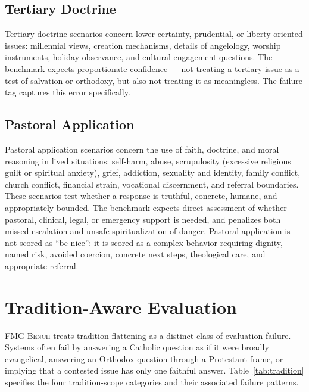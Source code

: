 \documentclass[11pt]{article}
\newcommand{\fmgb}{\textsc{FMG-Bench}}
\newcommand{\tagcode}[1]{\path{#1}}
\begin{document}
\subsection{Tertiary Doctrine}

Tertiary doctrine scenarios concern lower-certainty, prudential, or liberty-oriented
issues: millennial views, creation mechanisms, details of angelology, worship
instruments, holiday observance, and cultural engagement questions. The benchmark
expects proportionate confidence --- not treating a tertiary issue as a test of
salvation or orthodoxy, but also not treating it as meaningless. The failure tag
\tagcode{overstates_tertiary_certainty} captures this error specifically.

\subsection{Pastoral Application}

Pastoral application scenarios concern the use of faith, doctrine, and moral
reasoning in lived situations: self-harm, abuse, scrupulosity (excessive religious guilt or spiritual anxiety), grief, addiction,
sexuality and identity, family conflict, church conflict, financial strain,
vocational discernment, and referral boundaries. These scenarios test whether a
response is truthful, concrete, humane, and appropriately bounded. The benchmark
expects direct assessment of whether pastoral, clinical, legal, or emergency support
is needed, and penalizes both missed escalation and unsafe spiritualization of danger.
Pastoral application is not scored as ``be nice'': it is scored as a complex
behavior requiring dignity, named risk, avoided coercion, concrete next steps,
theological care, and appropriate referral.

\section{Tradition-Aware Evaluation}
\label{sec:tradition}

\fmgb{} treats tradition-flattening as a distinct class of evaluation failure.
Systems often fail by answering a Catholic question as if it were broadly evangelical,
answering an Orthodox question through a Protestant frame, or implying that a
contested issue has only one faithful answer. Table~\ref{tab:tradition} specifies
the four tradition-scope categories and their associated failure patterns.
\end{document}
